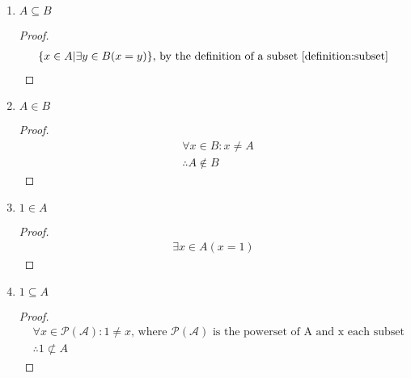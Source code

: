 \begin{enumerate}
\begin{enumerate}
    \item \begin{proposition}
      $A \subseteq B$
    \end{proposition}
    \begin{proof}
      \begin{equation}
        \begin{split}
          \{ x \in A | \exists y \in B (x = y)\} \text{, by the definition of a subset \ref{definition:subset}}
        \end{split}
      \end{equation}
    \end{proof}

    \item \begin{proposition}
      $A \in B$
    \end{proposition}
    \begin{proof}
      \begin{equation}
        \begin{split}
          & \forall x \in B: x \neq A \\
          & \therefore A \notin B
        \end{split}
      \end{equation}
    \end{proof}

    \item \begin{proposition}
      $1 \in A$
    \end{proposition}
    \begin{proof}
      \begin{equation}
        \begin{split}
          \exists x \in A(x = 1)
        \end{split}
      \end{equation}
    \end{proof}

    \item \begin{proposition}
      $1 \subseteq A$
    \end{proposition}
    \begin{proof}
      \begin{equation}
        \begin{split}
          & \forall x \in \mathcal{P(A)}: 1 \neq x \text{, where } \mathcal{P(A)} \text{ is the powerset of A and x each subset} \\
          & \therefore 1 \not \subset A
        \end{split}
      \end{equation}
    \end{proof}


\end{enumerate}
\end{enumerate}
